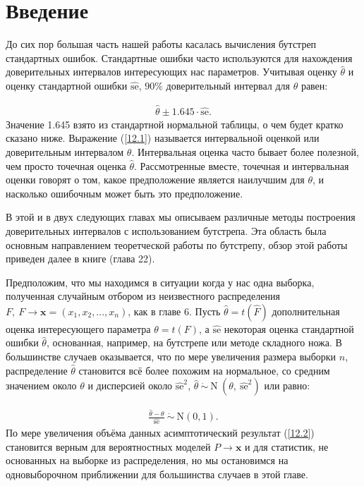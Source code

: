 \section{Введение}

До сих пор большая часть нашей работы касалась вычисления бутстреп стандартных ошибок. Стандартные ошибки часто используются для нахождения доверительных интервалов интересующих нас параметров. Учитывая оценку $\widehat{\theta}$ и оценку стандартной ошибки $\widehat{\text{se}}$, $ 90\% $ доверительный интервал для $\theta$ равен:

\begin{gather}\label{12.1}
\widehat{\theta} \pm 1.645 \cdot \widehat{\text{se}}.
\end{gather}
Значение 1.645 взято из стандартной нормальной таблицы, о чем будет кратко сказано ниже. Выражение (\ref{12.1}) называется интервальной оценкой или доверительным интервалом $\theta$. Интервальная оценка часто бывает более полезной, чем просто точечная оценка $\widehat{\theta}$. Рассмотренные вместе, точечная и интервальная оценки говорят о том, какое предположение является наилучшим для $\theta$, и насколько ошибочным может быть это предположение. 

В этой и в двух следующих главах мы описываем различные методы построения доверительных интервалов с использованием бутстрепа. Эта область была основным направлением теоретческой работы по бутстрепу, обзор этой работы приведен далее в книге (глава 22).

Предположим, что мы находимся в ситуации когда у нас одна выборка, полученная случайным отбором из неизвестного распределения $F, \ F \rightarrow \mathbf{x} = (x_{1}, x_{2},..., x_{n})$, как в главе 6. Пусть $\widehat{\theta} = t(\widehat{F})$ дополнительная оценка интересующего параметра $\theta = t(F)$, а $\widehat{\text{se}}$ некоторая оценка стандартной ошибки $\widehat{\theta}$, основанная, например, на бутстрепе или методе складного ножа. В большинстве случаев оказывается, что по мере увеличения размера выборки $n$, распределение $\widehat{\theta}$ становится всё более похожим на нормальное, со средним значением около $\theta$ и дисперсией около $\widehat{\text{se}}^{2}$, $\widehat{\theta}  \ \dot{\sim}  \ \mathrm{N} \  (\theta, \  \widehat{\text{se}}^{2})$ или равно:

\begin{gather}\label{12.2}
\frac{\widehat{\theta} - \theta}{\widehat{\text{se}}} \  \dot{\sim} \ \mathrm{N}(0,1).
\end{gather}
По мере увеличения объёма данных асимптотический результат (\ref{12.2}) становится верным для вероятностных моделей $P \rightarrow \mathbf{x}$ и для статистик, не основанных на выборке из распределения, но мы остановимся на одновыборочном приближении для большинства случаев в этой главе. 

